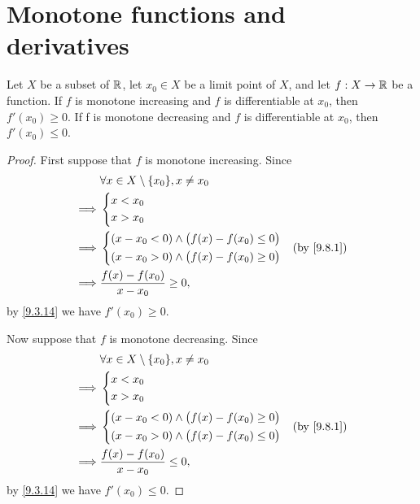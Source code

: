 \section{Monotone functions and derivatives}\label{sec:10.3}

\begin{prop}\label{10.3.1}
  Let \(X\) be a subset of \(\mathbb{R}\), let \(x_0 \in X\) be a limit point of \(X\), and let \(f : X \to \mathbb{R}\) be a function.
  If \(f\) is monotone increasing and \(f\) is differentiable at \(x_0\), then \(f'(x_0) \geq 0\).
  If f is monotone decreasing and \(f\) is differentiable at \(x_0\), then \(f'(x_0) \leq 0\).
\end{prop}

\begin{proof}
  First suppose that \(f\) is monotone increasing.
  Since
  \begin{align*}
             & \forall x \in X \setminus \{x_0\}, x \neq x_0      \\
    \implies & \begin{dcases}
                 x < x_0 \\
                 x > x_0 \\
               \end{dcases}                                      \\
    \implies & \begin{dcases}
                 (x - x_0 < 0) \land \big(f(x) - f(x_0) \leq 0\big) \\
                 (x - x_0 > 0) \land \big(f(x) - f(x_0) \geq 0\big) \\
               \end{dcases} &  & \by{9.8.1} \\
    \implies & \dfrac{f(x) - f(x_0)}{x - x_0} \geq 0,
  \end{align*}
  by \cref{9.3.14} we have \(f'(x_0) \geq 0\).

  Now suppose that \(f\) is monotone decreasing.
  Since
  \begin{align*}
             & \forall x \in X \setminus \{x_0\}, x \neq x_0      \\
    \implies & \begin{dcases}
                 x < x_0 \\
                 x > x_0 \\
               \end{dcases}                                      \\
    \implies & \begin{dcases}
                 (x - x_0 < 0) \land \big(f(x) - f(x_0) \geq 0\big) \\
                 (x - x_0 > 0) \land \big(f(x) - f(x_0) \leq 0\big) \\
               \end{dcases} &  & \by{9.8.1} \\
    \implies & \dfrac{f(x) - f(x_0)}{x - x_0} \leq 0,
  \end{align*}
  by \cref{9.3.14} we have \(f'(x_0) \leq 0\).
\end{proof}


